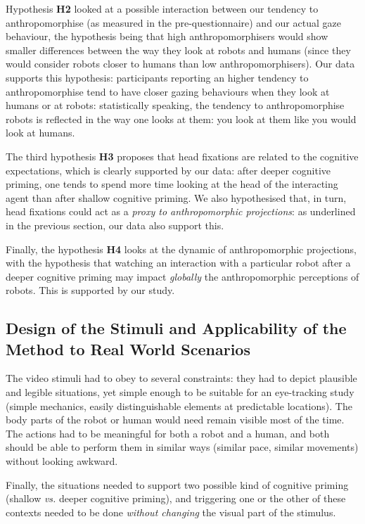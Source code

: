 \documentclass[lettersize, noapacite, twoside, HRI]{apa_HRI}
\newcommand{\vs}{\textit{vs.}\xspace}
\newcommand{\h}[1]{\textbf{H#1}\xspace}
\begin{document}
Hypothesis \h{2} looked at a possible interaction between our tendency to
anthropomorphise (as measured in the pre-questionnaire) and our actual gaze
behaviour, the hypothesis being that high anthropomorphisers would show smaller
differences between the way they look at robots and humans (since they would
consider robots closer to humans than low anthropomorphisers). Our data supports
this hypothesis: participants reporting an higher tendency to anthropomorphise
tend to have closer gazing behaviours when they look at humans or at robots:
statistically speaking, the tendency to anthropomorphise robots
is reflected in the way one looks at them: you look at them
like you would look at humans.

The third hypothesis \h{3} proposes that head fixations are related to the
cognitive expectations, which is clearly supported by our data: after deeper cognitive
priming, one tends to spend more time looking at the head of the interacting
agent than after shallow cognitive priming. We also hypothesised that, in turn,
head fixations could act as a \emph{proxy to anthropomorphic projections}: as
underlined in the previous section, our data also support this.

Finally, the hypothesis \h{4} looks at the dynamic of anthropomorphic
projections, with the hypothesis that watching an interaction with a particular
robot after a deeper cognitive priming may impact \emph{globally} the
anthropomorphic perceptions of robots. This is supported by our study.

\subsection{Design of the Stimuli and Applicability of the Method to Real World
Scenarios}
\label{stimuli_design}

The video stimuli had to obey to several constraints: they had to depict
plausible and legible situations, yet simple enough to be suitable for an
eye-tracking study (simple mechanics, easily distinguishable elements at
predictable locations). The body parts of the robot or human would need remain
visible most of the time. The actions had to be meaningful for both a robot and
a human, and both should be able to perform them in similar ways (similar pace,
similar movements) without looking awkward.

Finally, the situations needed to support two possible kind of cognitive priming
(shallow \vs deeper cognitive priming), and triggering one or the other of these
contexts needed to be done \emph{without changing} the visual part of the
stimulus.
\end{document}
